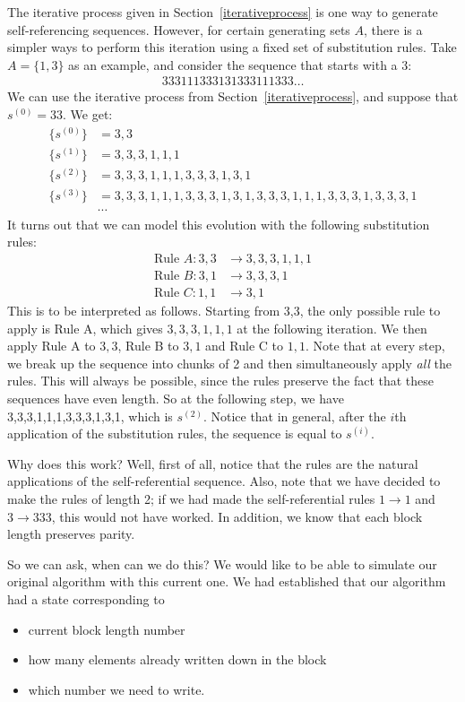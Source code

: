 \documentclass[runningheads,a4paper]{llncs}
\begin{document}
The iterative process given in Section~\ref{iterativeprocess} is one way to generate self-referencing sequences. However, for certain generating sets $A$, there is a simpler ways to perform this iteration using a fixed set of substitution rules. Take $A = \{1,3\}$ as an example, and consider the sequence that starts with a 3:
\begin{align*}
333111333131333111333\dots
\end{align*}
We can use the iterative process from Section~\ref{iterativeprocess}, and suppose that $s^{(0)} = 33$. We get:
\begin{align*}
\{s^{(0)}\} &= 3,3\\
\{s^{(1)}\} &= 3,3,3,1,1,1\\
\{s^{(2)}\} &= 3,3,3,1,1,1,3,3,3,1,3,1\\
\{s^{(3)}\} &= 3,3,3,1,1,1,3,3,3,1,3,1,3,3,3,1,1,1,3,3,3,1,3,3,3,1\\
&\cdots
\end{align*}
It turns out that we can model this evolution with the following substitution rules:
\begin{align*}
\text{Rule }A: 3,3 &\to 3,3,3,1,1,1 \\
\text{Rule }B: 3,1 &\to 3,3,3,1\\
\text{Rule }C: 1,1 &\to 3,1
\end{align*}
This is to be interpreted as follows. Starting from 3,3, the only possible rule to apply is Rule A, which gives $3,3,3,1,1,1$ at the following iteration. We then apply Rule A to $3,3$, Rule B to $3,1$ and Rule C to $1,1$. Note that at every step, we break up the sequence into chunks of 2 and then simultaneously apply \emph{all} the rules. This will always be possible, since the rules preserve the fact that these sequences have even length. So at the following step, we have 3,3,3,1,1,1,3,3,3,1,3,1, which is $s^{(2)}$. Notice that in general, after the $i$th application of the substitution rules, the sequence is equal to $s^{(i)}$.

Why does this work? Well, first of all, notice that the rules are the natural applications of the self-referential sequence. Also, note that we have decided to make the rules of length 2; if we had made the self-referential rules $1 \rightarrow 1$ and $3 \rightarrow 333$, this would not have worked. In addition, we know that each block length preserves parity. 

So we can ask, when can we do this? We would like to be able to simulate our original algorithm with this current one. We had established that our algorithm had a state corresponding to 
\begin{itemize}
\item current block length number
\item how many elements already written down in the block
\item which number we need to write.
\end{itemize}
\end{document}
